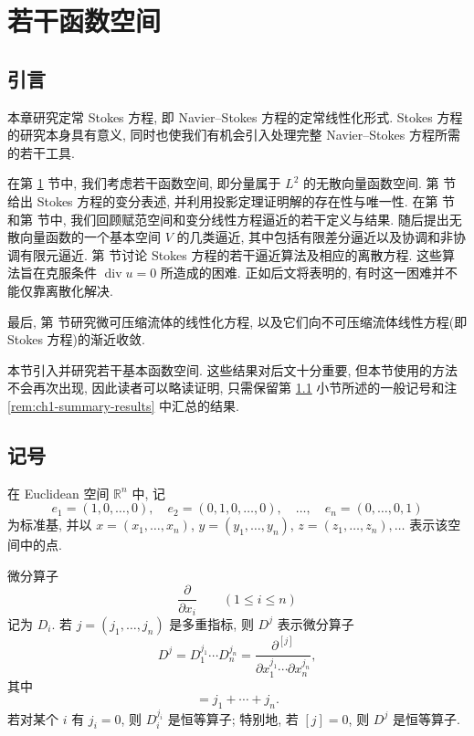 \section{若干函数空间}
\label{sec:ch1-function-spaces}

\subsection*{引言}

本章研究定常 Stokes 方程, 即 Navier--Stokes 方程的定常线性化形式. Stokes 方程的研究本身具有意义, 同时也使我们有机会引入处理完整 Navier--Stokes 方程所需的若干工具.

在第 \ref{sec:ch1-function-spaces} 节中, 我们考虑若干函数空间, 即分量属于 $L^2$ 的无散向量函数空间. 第  节给出 Stokes 方程的变分表述, 并利用投影定理证明解的存在性与唯一性. 在第  节和第  节中, 我们回顾赋范空间和变分线性方程逼近的若干定义与结果. 随后提出无散向量函数的一个基本空间 $V$ 的几类逼近, 其中包括有限差分逼近以及协调和非协调有限元逼近. 第  节讨论 Stokes 方程的若干逼近算法及相应的离散方程. 这些算法旨在克服条件 $\operatorname{div}u=0$ 所造成的困难. 正如后文将表明的, 有时这一困难并不能仅靠离散化解决.

最后, 第  节研究微可压缩流体的线性化方程, 以及它们向不可压缩流体线性方程(即 Stokes 方程)的渐近收敛.

本节引入并研究若干基本函数空间. 这些结果对后文十分重要, 但本节使用的方法不会再次出现, 因此读者可以略读证明, 只需保留第 \ref{subsec:ch1-notation} 小节所述的一般记号和注 \ref{rem:ch1-summary-results} 中汇总的结果.

\subsection{记号}
\label{subsec:ch1-notation}

在 Euclidean 空间 $\mathbb{R}^n$ 中, 记
\[
e_1=(1,0,\ldots,0),\quad e_2=(0,1,0,\ldots,0),\quad\ldots,\quad e_n=(0,\ldots,0,1)
\]
为标准基, 并以 $x=(x_1,\ldots,x_n)$, $y=(y_1,\ldots,y_n)$, $z=(z_1,\ldots,z_n),\ldots$ 表示该空间中的点.

微分算子
\[
\frac{\partial}{\partial x_i}\qquad(1\leq i\leq n)
\]
记为 $D_i$. 若 $j=(j_1,\ldots,j_n)$ 是多重指标, 则 $D^j$ 表示微分算子
\begin{equation}
D^j=D_1^{j_1}\cdots D_n^{j_n}
=\frac{\partial^{[j]}}{\partial x_1^{j_1}\cdots\partial x_n^{j_n}},
\label{eq:ch1-multi-index-derivative}
\end{equation}
其中
\begin{equation}
[j]=j_1+\cdots+j_n.
\label{eq:ch1-multi-index-order}
\end{equation}
若对某个 $i$ 有 $j_i=0$, 则 $D_i^{j_i}$ 是恒等算子; 特别地, 若 $[j]=0$, 则 $D^j$ 是恒等算子.

